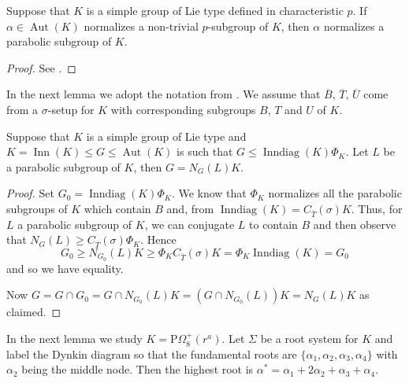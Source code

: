 \documentclass[12pt,a4paper]{amsart}
\DeclareMathOperator{\Aut}{Aut}
\DeclareMathOperator{\Inn}{Inn}
\DeclareMathOperator{\Inndiag}{Inndiag}
\newcommand{\ov}{\overline}
\begin{document}
\begin{lemma}\label{lem:normalise a parabolic}
Suppose that $K$ is a simple group of Lie type defined in characteristic $p$. If $\alpha \in \Aut(K)$ normalizes a non-trivial $p$-subgroup of $K$, then $\alpha$ normalizes a parabolic subgroup of $K$.
\end{lemma}

\begin{proof} See \cite[Lemma  4.8]{ParkerSaunders}. \end{proof}
 
In the next lemma we adopt the notation from \cite[Definition 2.5.10, Theorem 2.5.12]{GLS3}. We assume that $\overline B$, $\overline T$, $\overline U$ come from a $\sigma$-setup for $K$ with corresponding subgroups $B$, $T$ and $U$ of $K$.


 \begin{lemma}\label{lem:factors}
Suppose that $K$ is a simple group of Lie type and $K=\Inn(K) \le G \le \Aut(K)$ is such that $G \le \Inndiag(K)\Phi_K$. Let $L$ be a parabolic subgroup of $K$, then $G= N_G(L)K$.
\end{lemma}

\begin{proof}  Set $G_0= \Inndiag(K)\Phi_K$.
We know that $\Phi_K$ normalizes all the parabolic subgroups of $K$ which contain $B$ and,   from \cite[Remark 2.5.11(d)]{GLS3} $\Inndiag(K)= C_{\overline T}(\sigma) K$. Thus, for $L$ a parabolic subgroup of $K$, we can conjugate $L$ to contain $B$ and then observe that $N_G(L) \ge C_{\overline T}(\sigma) \Phi_K$. Hence $$G_0\ge N_{G_0}(L)K \ge \Phi_KC_{\ov T}(\sigma)K= \Phi_K\Inndiag(K)= G_0$$ and so we have equality.

Now $G= G \cap G_0= G\cap N_{G_0}(L)K = (G \cap N_{G_0}(L))K= N_G(L)K$ as claimed.
\end{proof}

In the next lemma we study $K=\mathrm{P}\Omega_8^+(r^a)$. Let  $\Sigma$ be a root system for $K$ and label the Dynkin diagram so that the fundamental roots are $\{\alpha_1,\alpha_2,\alpha_3,\alpha_4\}$ with $\alpha_2$ being the middle node. Then the highest root is $\alpha^*=\alpha_1+2\alpha_2+\alpha_3+\alpha_4$.
\end{document}
